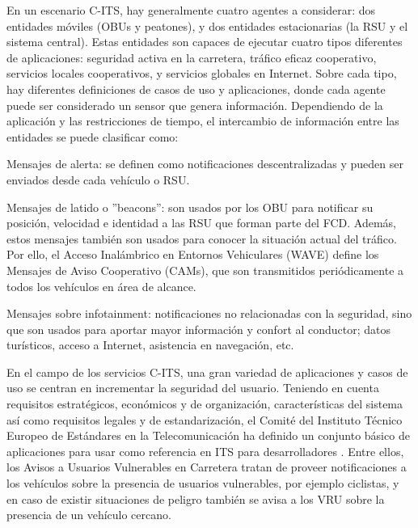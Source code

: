 En un escenario C-ITS, hay generalmente cuatro agentes a considerar: dos entidades
móviles (OBUs y peatones), y dos entidades estacionarias (la RSU y el sistema central).
Estas entidades son capaces de ejecutar cuatro tipos diferentes de aplicaciones:
seguridad activa en la carretera, tráfico eficaz cooperativo, servicios locales
cooperativos, y servicios globales en Internet. Sobre cada tipo, hay diferentes
definiciones de casos de uso y aplicaciones, donde cada agente puede ser considerado
un sensor que genera información. Dependiendo de la aplicación y las restricciones de 
tiempo, el intercambio de información entre las entidades se puede clasificar como:
\begin{description}
	\item{Mensajes de alerta:} se definen como notificaciones descentralizadas 
	y pueden ser enviados desde cada vehículo o RSU.

	\item{Mensajes de latido o ''beacons'':} son usados por los OBU para
	notificar su posición, velocidad e identidad a las RSU que forman parte del
	FCD. Además, estos mensajes también son usados para conocer la situación
	actual del tráfico. Por ello, el Acceso Inalámbrico en Entornos Vehiculares (WAVE)
	define los Mensajes de Aviso Cooperativo (CAMs), que son transmitidos periódicamente
	a todos los vehículos en área de alcance.

	\item{Mensajes sobre infotainment}: notificaciones no relacionadas con la seguridad,
	sino que son usados para aportar mayor información y confort al conductor; datos
	turísticos, acceso a Internet, asistencia en navegación, etc.
\end{description}

En el campo de los servicios C-ITS, una gran variedad de aplicaciones y casos de uso
se centran en incrementar la seguridad del usuario. Teniendo en cuenta requisitos
estratégicos, económicos y de organización, características del sistema así como
requisitos legales y de estandarización, el Comité del Instituto Técnico Europeo de
Estándares en la Telecomunicación ha definido un conjunto básico de aplicaciones para
usar como referencia en ITS para desarrolladores \cite{6}. Entre ellos, los Avisos a Usuarios
Vulnerables en Carretera tratan de proveer notificaciones a los vehículos sobre la
presencia de usuarios vulnerables, por ejemplo ciclistas, y en caso de existir situaciones
de peligro también se avisa a los VRU sobre la presencia de un vehículo cercano.

